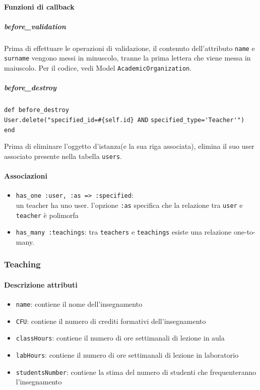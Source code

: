\documentclass[11pt,a4paper]{article}
\begin{document}
\paragraph{Funzioni di callback}
\subparagraph{before\_validation}
Prima di effettuare le operazioni di validazione, il contenuto dell'attributo \verb|name| e \verb|surname| vengono messi in minuscolo, tranne la prima lettera che viene messa in maiuscolo. Per il codice, vedi Model \verb|AcademicOrganization|.
\subparagraph{before\_destroy}
\begin{center}
 \verb|def before_destroy|\\
   \verb|User.delete("specified_id=#{self.id} AND|
   \verb|specified_type='Teacher'")|\\
   \verb|end|
\end{center}
Prima di eliminare l'oggetto d'istanza(e la sua riga associata), elimina il suo user associato presente nella tabella \verb|users|.
\paragraph{Associazioni}
\begin{itemize}
 \item \verb|has_one :user, :as => :specified|:\\ un teacher ha uno user. l'opzione \verb|:as| specifica che la relazione tra \verb|user| e \verb|teacher| è polimorfa
\item \verb|has_many :teachings|: tra \verb|teachers| e \verb|teachings| esiste una relazione one-to-many.
\end{itemize}
\subsubsection{Teaching}
\paragraph{Descrizione attributi}
\begin{itemize}
 \item \verb|name|: contiene il nome dell'insegnamento
 \item \verb|CFU|: contiene il numero di crediti formativi dell'insegnamento
 \item \verb|classHours|: contiene il numero di ore settimanali di lezione in aula
 \item \verb|labHours|: contiene il numero di ore settimanali di lezione in laboratorio
 \item \verb|studentsNumber|: contiene la stima del numero di studenti che frequenteranno l'insegnamento 
\end{itemize}
\end{document}

